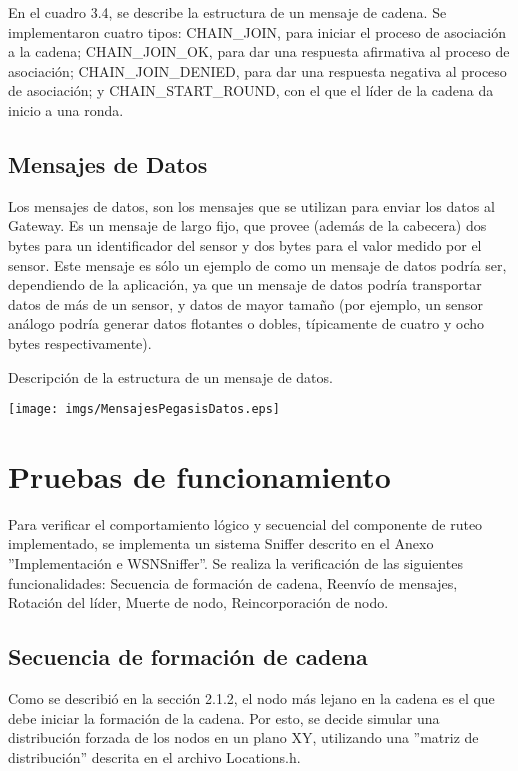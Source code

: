 En el cuadro 3.4, se describe la estructura de un mensaje de cadena. Se implementaron cuatro tipos: CHAIN\_JOIN, para iniciar el proceso de asociación a la cadena; CHAIN\_JOIN\_OK, para dar una respuesta afirmativa al proceso de asociación; CHAIN\_JOIN\_DENIED, para dar una respuesta negativa al proceso de asociación; y CHAIN\_START\_ROUND, con el que el líder de la cadena da inicio a una ronda.

\subsection{Mensajes de Datos}
Los mensajes de datos, son los mensajes que se utilizan para enviar los datos al Gateway. Es un mensaje de largo fijo, que provee (además de la cabecera) dos bytes para un identificador del sensor y dos bytes para el valor medido por el sensor. Este mensaje es sólo un ejemplo de como un mensaje de datos podría ser, dependiendo de la aplicación, ya que un mensaje de datos podría transportar datos de más de un sensor, y datos de mayor tamaño (por ejemplo, un sensor análogo podría generar datos flotantes o dobles, típicamente de cuatro y ocho bytes respectivamente).

\begin{table}[H]
  \centering
  \caption{Descripción de la estructura de un mensaje de datos.}
 \texttt{[image: imgs/MensajesPegasisDatos.eps]}
\end{table}

\section{Pruebas de funcionamiento}
Para verificar el comportamiento lógico y secuencial del componente de ruteo implementado, se implementa un sistema Sniffer descrito en el Anexo ''Implementación e WSNSniffer''.  Se realiza la verificación de las siguientes funcionalidades: Secuencia de formación de cadena, Reenvío de mensajes,  Rotación del líder, Muerte de nodo, Reincorporación de nodo.

\subsection{Secuencia de formación de cadena}
Como se describió en la sección 2.1.2, el nodo más lejano en la cadena es el que debe iniciar la formación de la cadena. Por esto, se decide simular una distribución forzada de los nodos en un plano XY, utilizando una ''matriz de distribución'' descrita en el archivo Locations.h. 

